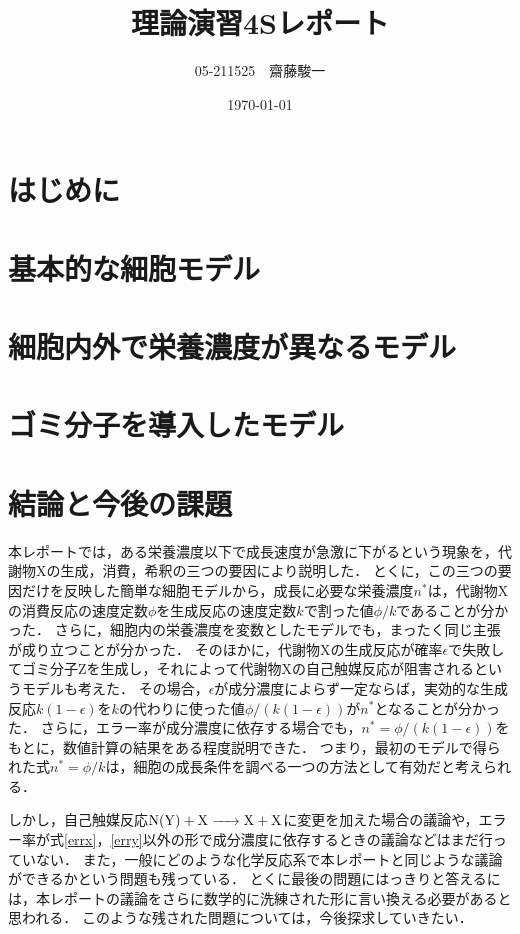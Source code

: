 \documentclass[a4paper,11pt]{jsarticle}
\begin{document}
\title{理論演習4Sレポート}
\author{05-211525　齋藤駿一}
\date{\today}
\maketitle

\tableofcontents

\section{はじめに}


\section{基本的な細胞モデル}


\section{細胞内外で栄養濃度が異なるモデル}


\section{ゴミ分子を導入したモデル}


\section{結論と今後の課題}
本レポートでは，ある栄養濃度以下で成長速度が急激に下がるという現象を，代謝物Xの生成，消費，希釈の三つの要因により説明した．
とくに，この三つの要因だけを反映した簡単な細胞モデルから，成長に必要な栄養濃度$n^*$は，代謝物Xの消費反応の速度定数$\phi$を生成反応の速度定数$k$で割った値$\phi/k$であることが分かった．
さらに，細胞内の栄養濃度を変数としたモデルでも，まったく同じ主張が成り立つことが分かった．
そのほかに，代謝物Xの生成反応が確率$\epsilon$で失敗してゴミ分子Zを生成し，それによって代謝物Xの自己触媒反応が阻害されるというモデルも考えた．
その場合，$\epsilon$が成分濃度によらず一定ならば，実効的な生成反応$k(1-\epsilon)$を$k$の代わりに使った値$\phi/(k(1-\epsilon))$が$n^*$となることが分かった．
さらに，エラー率が成分濃度に依存する場合でも，$n^*=\phi/(k(1-\epsilon))$をもとに，数値計算の結果をある程度説明できた．
つまり，最初のモデルで得られた式$n^*=\phi/k$は，細胞の成長条件を調べる一つの方法として有効だと考えられる．

しかし，自己触媒反応$\ce{N(Y) + X -> X + X}$に変更を加えた場合の議論や，エラー率が式\eqref{errx}，\eqref{erry}以外の形で成分濃度に依存するときの議論などはまだ行っていない．
また，一般にどのような化学反応系で本レポートと同じような議論ができるかという問題も残っている．
とくに最後の問題にはっきりと答えるには，本レポートの議論をさらに数学的に洗練された形に言い換える必要があると思われる．
このような残された問題については，今後探求していきたい．
\end{document}
